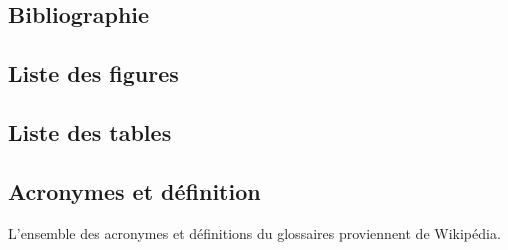\documentclass[12pt, a4paper, twoside]{article}
\begin{document}
\newpage
\subsection*{Bibliographie}
\nocite{*}
\printbibliography\thispagestyle{fancy}
\newpage
\subsection*{Liste des figures}
\listoffigures\thispagestyle{fancy}

\newpage
\subsection*{Liste des tables}
\listoftables\thispagestyle{fancy}

\newpage
\subsection*{Acronymes et définition}
L'ensemble des acronymes et définitions du glossaires proviennent de Wikipédia.
\glsaddall
\printglossaries\thispagestyle{fancy}
\end{document}
